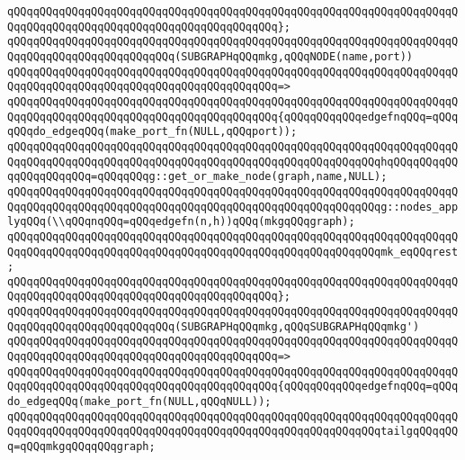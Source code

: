 \verb|qQQqqQQqqQQqqQQqqQQqqQQqqQQqqQQqqQQqqQQqqQQqqQQqqQQqqQQqqQQqqQQqqQQqqQQqqQQqqQQqqQQqqQQqqQQqqQQqqQQqqQQqqQQqqQQq};|\newline
\newline
\verb|qQQqqQQqqQQqqQQqqQQqqQQqqQQqqQQqqQQqqQQqqQQqqQQqqQQqqQQqqQQqqQQqqQQqqQQqqQQqqQQqqQQqqQQqqQQqqQQq(SUBGRAPHqQQqmkg,qQQqNODE(name,port))|\newline
\verb|qQQqqQQqqQQqqQQqqQQqqQQqqQQqqQQqqQQqqQQqqQQqqQQqqQQqqQQqqQQqqQQqqQQqqQQqqQQqqQQqqQQqqQQqqQQqqQQqqQQqqQQqqQQqqQQq=>|\newline
\verb|qQQqqQQqqQQqqQQqqQQqqQQqqQQqqQQqqQQqqQQqqQQqqQQqqQQqqQQqqQQqqQQqqQQqqQQqqQQqqQQqqQQqqQQqqQQqqQQqqQQqqQQqqQQqqQQq{qQQqqQQqqQQqedgefnqQQq=qQQqqQQqdo_edgeqQQq(make_port_fn(NULL,qQQqport));|\newline
\verb|qQQqqQQqqQQqqQQqqQQqqQQqqQQqqQQqqQQqqQQqqQQqqQQqqQQqqQQqqQQqqQQqqQQqqQQqqQQqqQQqqQQqqQQqqQQqqQQqqQQqqQQqqQQqqQQqqQQqqQQqqQQqqQQqhqQQqqQQqqQQqqQQqqQQqqQQq=qQQqqQQqg::get_or_make_node(graph,name,NULL);|\newline
\newline
\verb|qQQqqQQqqQQqqQQqqQQqqQQqqQQqqQQqqQQqqQQqqQQqqQQqqQQqqQQqqQQqqQQqqQQqqQQqqQQqqQQqqQQqqQQqqQQqqQQqqQQqqQQqqQQqqQQqqQQqqQQqqQQqqQQqg::nodes_applyqQQq(\\qQQqnqQQq=qQQqedgefn(n,h))qQQq(mkgqQQqgraph);|\newline
\newline
\verb|qQQqqQQqqQQqqQQqqQQqqQQqqQQqqQQqqQQqqQQqqQQqqQQqqQQqqQQqqQQqqQQqqQQqqQQqqQQqqQQqqQQqqQQqqQQqqQQqqQQqqQQqqQQqqQQqqQQqqQQqqQQqqQQqmk_eqQQqrest;|\newline
\verb|qQQqqQQqqQQqqQQqqQQqqQQqqQQqqQQqqQQqqQQqqQQqqQQqqQQqqQQqqQQqqQQqqQQqqQQqqQQqqQQqqQQqqQQqqQQqqQQqqQQqqQQqqQQqqQQq};|\newline
\newline
\verb|qQQqqQQqqQQqqQQqqQQqqQQqqQQqqQQqqQQqqQQqqQQqqQQqqQQqqQQqqQQqqQQqqQQqqQQqqQQqqQQqqQQqqQQqqQQqqQQq(SUBGRAPHqQQqmkg,qQQqSUBGRAPHqQQqmkg')|\newline
\verb|qQQqqQQqqQQqqQQqqQQqqQQqqQQqqQQqqQQqqQQqqQQqqQQqqQQqqQQqqQQqqQQqqQQqqQQqqQQqqQQqqQQqqQQqqQQqqQQqqQQqqQQqqQQqqQQq=>|\newline
\verb|qQQqqQQqqQQqqQQqqQQqqQQqqQQqqQQqqQQqqQQqqQQqqQQqqQQqqQQqqQQqqQQqqQQqqQQqqQQqqQQqqQQqqQQqqQQqqQQqqQQqqQQqqQQqqQQq{qQQqqQQqqQQqedgefnqQQq=qQQqdo_edgeqQQq(make_port_fn(NULL,qQQqNULL));|\newline
\newline
\verb|qQQqqQQqqQQqqQQqqQQqqQQqqQQqqQQqqQQqqQQqqQQqqQQqqQQqqQQqqQQqqQQqqQQqqQQqqQQqqQQqqQQqqQQqqQQqqQQqqQQqqQQqqQQqqQQqqQQqqQQqqQQqqQQqtailgqQQqqQQq=qQQqmkgqQQqqQQqgraph;|\newline
